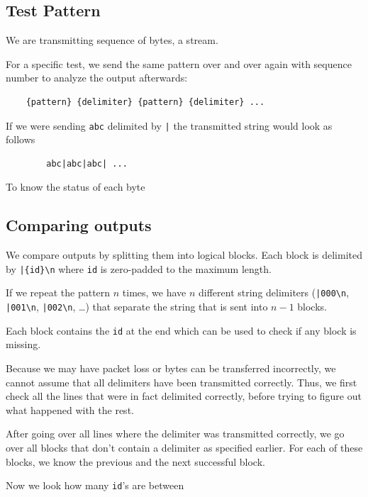 \documentclass[../main.tex]{subfiles}
\begin{document}

    \subsection{Test Pattern}
    We are transmitting sequence of bytes, a stream.

    For a specific test, we send the same pattern over and over again with sequence number to analyze the output afterwards:
    \begin{verbatim}
    {pattern} {delimiter} {pattern} {delimiter} ...
    \end{verbatim}

    If we were sending \verb|abc| delimited by \verb-|- the transmitted string would look as follows
    \begin{verbatim}
        abc|abc|abc| ...
    \end{verbatim}

    To know the status of each byte

    \subsection{Comparing outputs}
    We compare outputs by splitting them into logical blocks. Each block is delimited by \verb-|{id}\n- where \texttt{id} is zero-padded to the maximum length.

    If we repeat the pattern $n$ times, we have $n$ different string delimiters (\verb-|000\n-, \verb-|001\n-, \verb-|002\n-, \ldots) that separate the string that is sent into $n-1$ blocks.

    Each block contains the \texttt{id} at the end which can be used to check if any block is missing.

    Because we may have packet loss or bytes can be transferred incorrectly, we cannot assume that all delimiters have been transmitted correctly. Thus, we first check all the lines that were in fact delimited correctly, before trying to figure out what happened with the rest.

    After going over all lines where the delimiter was transmitted correctly, we go over all blocks that don't contain a delimiter as specified earlier. For each of these blocks, we know the previous and the next successful block.

    Now we look how many \texttt{id}'s are between 
\end{document}
